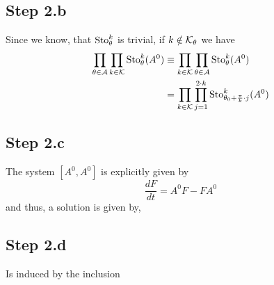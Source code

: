 \subsection{Step 2.b}
Since we know, that $\operatorname{Sto}_{\theta}^k$ is trivial, if $k\notin\mathcal{K}_\theta$ we
have
\begin{align*}
  \prod_{\theta\in\mathcal{A}}\prod_{k\in\mathcal{K}}\operatorname{Sto}_\theta^k(A^0)
  &\equiv \prod_{k\in\mathcal{K}}\prod_{\theta\in\mathcal{A}}\operatorname{Sto}_\theta^k(A^0)
\\&= \prod_{k\in\mathcal{K}} \prod_{j=1}^{2\cdot k}
  \operatorname{Sto}_{\theta_0+\frac{\pi}{k}\cdot j}^k(A^0)
\end{align*}

\subsection{Step 2.c}
The system $[A^0,A^0]$ is explicitly given by
\[
  \frac{dF}{dt}=A^0F-FA^0
\]
and thus, a solution is given by, \TODO{}

\subsection{Step 2.d}
Is induced by the inclusion \TODO{}


